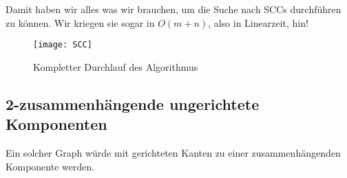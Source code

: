 Damit haben wir alles was wir brauchen, um die Suche nach SCCs durchführen zu können. Wir kriegen sie sogar in \( O(m+n) \), also in Linearzeit, hin!

\begin{figure}[H]
  \texttt{[image: SCC]}
  \caption{Kompletter Durchlauf des Algorithmus}
\end{figure}

\subsection{2-zusammenhängende ungerichtete Komponenten}
Ein solcher Graph würde mit gerichteten Kanten zu einer zusammenhängenden Komponente werden.